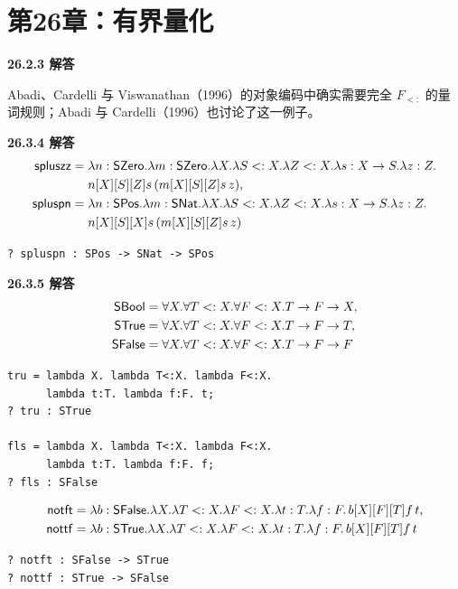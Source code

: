 \newpage
\section{第26章：有界量化}

\begin{taplauthorsolutionentrybox}
\label{sol:author:26.2.3}
\textbf{26.2.3 解答}

Abadi、Cardelli 与 Viswanathan（1996）的对象编码中确实需要完全
\(F_{<:}\) 的量词规则；Abadi 与 Cardelli（1996）也讨论了这一例子。
\end{taplauthorsolutionentrybox}

\begin{taplauthorsolutionentrybox}
\label{sol:author:26.3.4}
\textbf{26.3.4 解答}
\[
\begin{aligned}
\mathsf{spluszz}
={}&\lambda n:\mathsf{SZero}.\lambda m:\mathsf{SZero}.
\lambda X.\lambda S<:X.\lambda Z<:X.\lambda s:X\to S.\lambda z:Z.\\
&n[X][S][Z]s\,(m[X][S][Z]s\,z),\\
\mathsf{spluspn}
={}&\lambda n:\mathsf{SPos}.\lambda m:\mathsf{SNat}.
\lambda X.\lambda S<:X.\lambda Z<:X.\lambda s:X\to S.\lambda z:Z.\\
&n[X][S][X]s\,(m[X][S][Z]s\,z)
\end{aligned}
\]
\begin{lstlisting}
? spluspn : SPos -> SNat -> SPos
\end{lstlisting}
\end{taplauthorsolutionentrybox}

\begin{taplauthorsolutionentrybox}
\label{sol:author:26.3.5}
\textbf{26.3.5 解答}
\[
\begin{aligned}
\mathsf{SBool}
 &=\forall X.\forall T<:X.\forall F<:X.T\to F\to X,\\
\mathsf{STrue}
 &=\forall X.\forall T<:X.\forall F<:X.T\to F\to T,\\
\mathsf{SFalse}
 &=\forall X.\forall T<:X.\forall F<:X.T\to F\to F
\end{aligned}
\]
\begin{lstlisting}
tru = lambda X. lambda T<:X. lambda F<:X.
      lambda t:T. lambda f:F. t;
? tru : STrue

fls = lambda X. lambda T<:X. lambda F<:X.
      lambda t:T. lambda f:F. f;
? fls : SFalse
\end{lstlisting}
\[
\begin{aligned}
\mathsf{notft}
 &=\lambda b:\mathsf{SFalse}.\lambda X.\lambda T<:X.\lambda F<:X.
   \lambda t:T.\lambda f:F.\,b[X][F][T]f\,t,\\
\mathsf{nottf}
 &=\lambda b:\mathsf{STrue}.\lambda X.\lambda T<:X.\lambda F<:X.
   \lambda t:T.\lambda f:F.\,b[X][F][T]f\,t
\end{aligned}
\]
\begin{lstlisting}
? notft : SFalse -> STrue
? nottf : STrue -> SFalse
\end{lstlisting}
\end{taplauthorsolutionentrybox}

